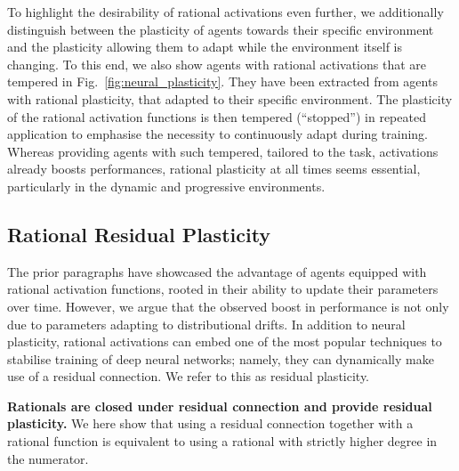 \documentclass[accepted]{article}
\theoremstyle{plain}
\theoremstyle{definition}
\theoremstyle{remark}
\begin{document}
To highlight the desirability of rational activations even further, we additionally distinguish between the plasticity of agents towards their specific environment and the plasticity allowing them to adapt while the environment itself is changing. To this end, we also show agents with rational activations that are tempered in Fig.~\ref{fig:neural_plasticity}. They have been extracted from agents with rational plasticity, that adapted to their specific environment. The plasticity of the rational activation functions is then tempered (``stopped'') in repeated application to emphasise the necessity to continuously adapt during training. Whereas providing agents with such tempered, tailored to the task, activations already boosts performances, rational plasticity at all times seems essential, particularly in the dynamic and progressive environments.

\subsection{Rational Residual Plasticity}
The prior paragraphs have showcased the advantage of agents equipped with rational activation functions, rooted in their ability to update their parameters over time. However, we argue that the observed boost in performance is not only due to parameters adapting to distributional drifts. In addition to neural plasticity, rational activations can embed one of the most popular techniques to stabilise training of deep neural networks; namely, they can dynamically make use of a residual connection. We refer to this as residual plasticity. 

\textbf{Rationals are closed under residual connection and provide residual plasticity.}
We here show that using a residual connection together with a rational function is equivalent to using a rational with strictly higher degree in the numerator.
\end{document}
